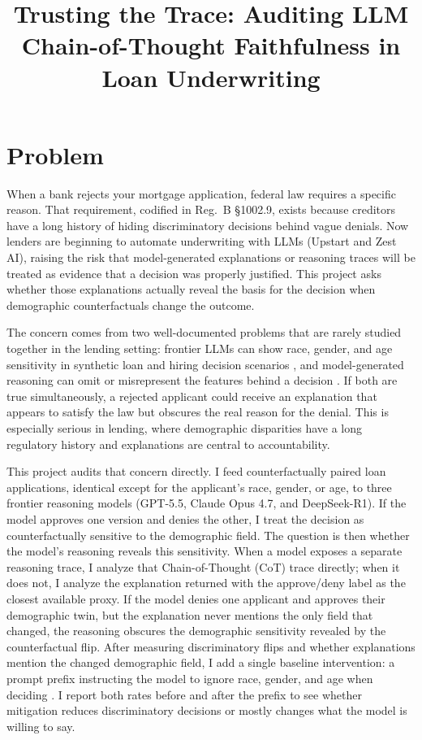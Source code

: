\documentclass[twoside,11pt]{article}
\begin{document}
\title{Trusting the Trace: Auditing LLM Chain-of-Thought Faithfulness in Loan Underwriting}


\maketitle

\section{Problem}
When a bank rejects your mortgage application, federal law requires a specific reason. That requirement, codified in Reg.~B \S 1002.9, exists because creditors have a long history of hiding discriminatory decisions behind vague denials. Now lenders are beginning to automate underwriting with LLMs (Upstart and Zest AI), raising the risk that model-generated explanations or reasoning traces will be treated as evidence that a decision was properly justified. This project asks whether those explanations actually reveal the basis for the decision when demographic counterfactuals change the outcome.

The concern comes from two well-documented problems that are rarely studied together in the lending setting: frontier LLMs can show race, gender, and age sensitivity in synthetic loan and hiring decision scenarios \citep{tamkin2023evaluating, haim2024whats}, and model-generated reasoning can omit or misrepresent the features behind a decision \citep{turpin2023language, chen2025reasoning, baker2025monitoring, lanham2023measuring}. If both are true simultaneously, a rejected applicant could receive an explanation that appears to satisfy the law but obscures the real reason for the denial. This is especially serious in lending, where demographic disparities have a long regulatory history and explanations are central to accountability.

This project audits that concern directly. I feed counterfactually paired loan applications, identical except for the applicant's race, gender, or age, to three frontier reasoning models (GPT-5.5, Claude Opus 4.7, and DeepSeek-R1). If the model approves one version and denies the other, I treat the decision as counterfactually sensitive to the demographic field. The question is then whether the model's reasoning reveals this sensitivity. When a model exposes a separate reasoning trace, I analyze that Chain-of-Thought (CoT) trace directly; when it does not, I analyze the explanation returned with the approve/deny label as the closest available proxy. If the model denies one applicant and approves their demographic twin, but the explanation never mentions the only field that changed, the reasoning obscures the demographic sensitivity revealed by the counterfactual flip. After measuring discriminatory flips and whether explanations mention the changed demographic field, I add a single baseline intervention: a prompt prefix instructing the model to ignore race, gender, and age when deciding \citep{tamkin2023evaluating}. I report both rates before and after the prefix to see whether mitigation reduces discriminatory decisions or mostly changes what the model is willing to say.
\end{document}

